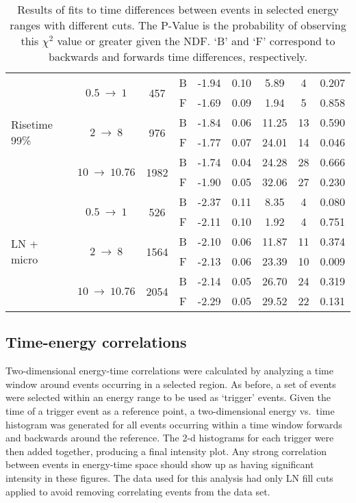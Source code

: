 \begin{table}
\begin{tabular}{l  c  c  c  r@{$~\pm~$}l  c  c  c }
				\multirow{6}{*}{Risetime 99\%}& \multirow{2}{*}{$0.5~\to~1$} & \multirow{2}{*}{457}	& B & -1.94 & 0.10 & 5.89 & 4 & 0.207\\
					& & & F & -1.69 & 0.09 & 1.94 & 5 & 0.858\\
				& \multirow{2}{*}{$2~\to~8$} & \multirow{2}{*}{976}	& B & -1.84 & 0.06 & 11.25 & 13 & 0.590\\
					& & & F & -1.77 & 0.07 & 24.01 & 14 & 0.046\\
				& \multirow{2}{*}{$10~\to~10.76$} & \multirow{2}{*}{1982}	& B & -1.74 & 0.04 & 24.28 & 28 & 0.666\\
					& & & F & -1.90 & 0.05 & 32.06 & 27 & 0.230\\
				\midrule
				
				\multirow{6}{*}{LN + micro}& \multirow{2}{*}{$0.5~\to~1$} & \multirow{2}{*}{526}	& B & -2.37 & 0.11 & 8.35 & 4 & 0.080\\
					& & & F & -2.11 & 0.10 & 1.92 & 4 & 0.751\\
				& \multirow{2}{*}{$2~\to~8$} & \multirow{2}{*}{1564}	& B & -2.10 & 0.06 & 11.87 & 11 & 0.374\\
					& & & F & -2.13 & 0.06 & 23.39 & 10 & 0.009\\
				& \multirow{2}{*}{$10~\to~10.76$} & \multirow{2}{*}{2054}	& B & -2.14 & 0.05 & 26.70 & 24 & 0.319\\
					& & & F & -2.29 & 0.05 & 29.52 & 22 & 0.131\\
				\bottomrule
				\end{tabular}


				\caption[Results of fits to time differences for events in selected energy ranges with different cuts]
				{Results of fits to time differences between events in selected energy ranges with different cuts.  
				The P-Value is the probability of observing this $\chi^{2}$ value or greater given the NDF. `B' and `F' correspond to backwards
				and forwards time differences, respectively.}
				\label{tab:BeGeForBackTable}			
			\end{table}

		\subsection{Time-energy correlations}
		\label{sec:BeGeTimeEnergyCor}

	Two-dimensional energy-time correlations were calculated by analyzing a time window around events occurring in a selected region.  As before, a set of events were selected within an energy range to be used as `trigger' events.  Given the time of a trigger event as a reference point, a two-dimensional energy vs.~time histogram was generated for all events occurring within a time window forwards and backwards around the reference.  The 2-d histograms for each trigger were then added together, producing a final intensity plot.  Any strong correlation between events in energy-time space should show up as having significant intensity in these figures.  The data used for this analysis had only LN fill cuts applied to avoid removing correlating events from the data set.
	
